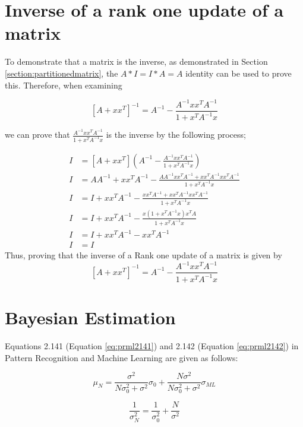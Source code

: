 \documentclass[a4paper, 11pt]{article}
\begin{document}
    
\pagebreak

\section{Inverse of a rank one update of a matrix}

To demonstrate that a matrix is the inverse, as demonstrated in Section \ref{section:partitionedmatrix}, the $A*I = I*A = A$ identity can be used to prove this. Therefore, when examining 

$$ [A + xx^T ]^{-1} = A^{-1} - \frac{A^{-1}xx^TA^{-1}}{1 + x^TA^{-1}x}$$

we can prove that $\frac{A^{-1}xx^TA^{-1}}{1 + x^TA^{-1}x}$ is the inverse by the following process;

\begin{align*}
    I &= [A + xx^T ] \left(A^{-1} - \frac{A^{-1}xx^TA^{-1}}{1 + x^TA^{-1}x}\right) \\
    I &= AA^{-1} + xx^TA^{-1} - \frac{AA^{-1}xx^TA^{-1} + xx^TA^{-1}xx^TA^{-1}}{1 + x^TA^{-1}x}\\
    I &= I + xx^TA^{-1} - \frac{xx^TA^{-1} + xx^TA^{-1}xx^TA^{-1}}{1+x^TA^{-1}x} \\
    I &= I + xx^TA^{-1} - \frac{x(1+x^TA^{-1}x)x^TA}{1+x^TA^{-1}x} \\
    I &= I + xx^TA^{-1} - xx^TA^{-1} \\
    I &= I
\end{align*}
 Thus, proving that the inverse of a Rank one update of a matrix is given by 
$$ [A + xx^T ]^{-1} = A^{-1} - \frac{A^{-1}xx^TA^{-1}}{1 + x^TA^{-1}x}$$

\section{Bayesian Estimation}

Equations 2.141 (Equation \ref{eq:prml2141}) and 2.142 (Equation \ref{eq:prml2142}) in Pattern Recognition and Machine Learning are given as follows:

\begin{equation} \label{eq:prml2141}
\mu_N = \frac{\sigma^2}{N\sigma_0^2 + \sigma^2}\sigma_0 + \frac{N\sigma^2}{N\sigma_0^2 + \sigma^2}\sigma_{ML}
\end{equation}

\begin{equation} \label{eq:prml2142}
\frac{1}{\sigma^2_N} = \frac{1}{\sigma^2_0} + \frac{N}{\sigma^2}
\end{equation}
\end{document}
